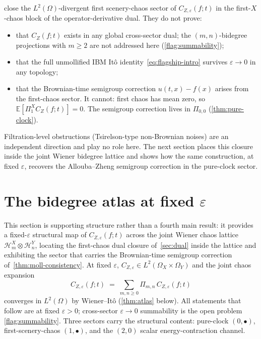 \documentclass[EJP]{ejpecp}
\renewcommand{\E}{\mathbb{E}}
\newcommand{\Hilb}{\mathcal{H}}
\newcommand{\IBM}{Z}
\newcommand{\Pir}{\Pi}
\begin{document}
 close the
$L^{2}(\Omega)$-divergent first scenery-chaos sector of
$C_{\IBM,\varepsilon}(f;t)$ in the first-$X$-chaos block of the
operator-derivative dual. They do not prove:
\begin{itemize}
\item that $C_\IBM(f;t)$ exists in any global cross-sector dual; the
$(m,n)$-bidegree projections with $m\ge 2$ are not addressed here
(\cref{flag:summability});
\item that the full unmollified IBM It\^o
identity~\eqref{eq:flagship-intro} survives $\varepsilon\to 0$ in
any topology;
\item that the Brownian-time semigroup correction
$u(t,x)-f(x)$ arises from the first-chaos sector. It cannot:
first chaos has mean zero, so $\E[\Pir_1^{X}C_{\IBM}(f;t)]=0$. The
semigroup correction lives in $\Pir_{0,0}$ (\cref{thm:pure-clock}).
\end{itemize}
Filtration-level obstructions (Tsirelson-type non-Brownian noises)
are an independent direction and play no role here. The next
section places this closure inside the joint Wiener bidegree
lattice and shows how the same construction, at fixed $\varepsilon$,
recovers the Allouba--Zheng semigroup correction in the pure-clock
sector.

\section{The bidegree atlas at fixed $\varepsilon$}\label{sec:atlas}

This section is supporting structure rather than a fourth main
result: it provides a fixed-$\varepsilon$ structural map of
$C_{\IBM,\varepsilon}(f;t)$ across the joint Wiener chaos lattice
$\Hilb_m^X\otimes\Hilb_n^Y$, locating the first-chaos dual closure
of~\cref{sec:dual} inside the lattice and exhibiting the sector
that carries the Brownian-time semigroup correction
of~\cref{thm:moll-consistency}. At fixed
$\varepsilon$, $C_{\IBM,\varepsilon}\in L^{2}(\Omega_X\times\Omega_Y)$
and the joint chaos expansion
\begin{equation}\label{eq:atlas-conv}
 C_{\IBM,\varepsilon}(f;t)
 \;=\;\sum_{m,n\ge 0}\Pir_{m,n}\,C_{\IBM,\varepsilon}(f;t)
\end{equation}
converges in $L^{2}(\Omega)$ by Wiener--It\^o
(\cref{thm:atlas} below). All statements that follow are at fixed
$\varepsilon>0$; cross-sector $\varepsilon\to 0$
summability is the open problem \cref{flag:summability}. Three
sectors carry the structural content: pure-clock $(0,\bullet)$,
first-scenery-chaos $(1,\bullet)$, and the $(2,0)$ scalar
energy-contraction channel.
\end{document}
